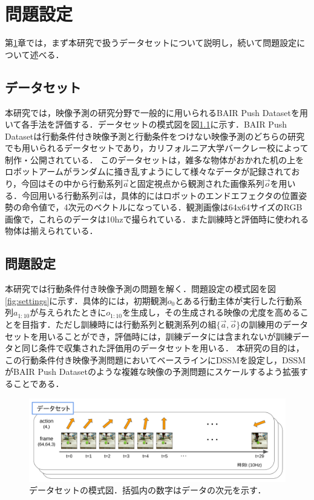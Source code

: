 \chapter{問題設定}
\label{chap:settings}

第\ref{chap:settings}章では，まず本研究で扱うデータセットについて説明し，続いて問題設定について述べる．

\section{データセット}

本研究では，映像予測の研究分野で一般的に用いられるBAIR Push Dataset\cite{ebert2017selfsupervised}を用いて各手法を評価する．データセットの模式図を図\ref{fig:dataset}に示す．BAIR Push Datasetは行動条件付き映像予測と行動条件をつけない映像予測のどちらの研究でも用いられるデータセットであり，カリフォルニア大学バークレー校によって制作・公開されている．
このデータセットは，雑多な物体がおかれた机の上をロボットアームがランダムに掻き乱すようにして様々なデータが記録されており，今回はその中から行動系列$\vec{a}$と固定視点から観測された画像系列$\vec{o}$を用いる．今回用いる行動系列$\vec{a}$は，具体的にはロボットのエンドエフェクタの位置姿勢の命令値で，4次元のベクトルになっている．観測画像は64x64サイズのRGB画像で，これらのデータは10hzで撮られている．また訓練時と評価時に使われる物体は揃えられている．


\section{問題設定}

本研究では行動条件付き映像予測の問題を解く．問題設定の模式図を図\ref{fig:settings}に示す．具体的には，初期観測$o_0$とある行動主体が実行した行動系列$a_{1:10}$が与えられたときに$o_{1:10}$を生成し，その生成される映像の尤度を高めることを目指す．ただし訓練時には行動系列と観測系列の組$\{\vec{a}, \vec{o}\}$の訓練用のデータセットを用いることができ，評価時には，訓練データには含まれないが訓練データと同じ条件で収集された評価用のデータセットを用いる．
本研究の目的は，この行動条件付き映像予測問題においてベースラインにDSSMを設定し，DSSMがBAIR Push Datasetのような複雑な映像の予測問題にスケールするよう拡張することである．

\begin{figure}[h]
    \begin{center}
      \includegraphics[scale=0.22]{./figures/dataset.png}
      \caption[データセットの模式図]{データセットの模式図．括弧内の数字はデータの次元を示す．}
      \label{fig:dataset}
    \end{center}
  \end{figure}

